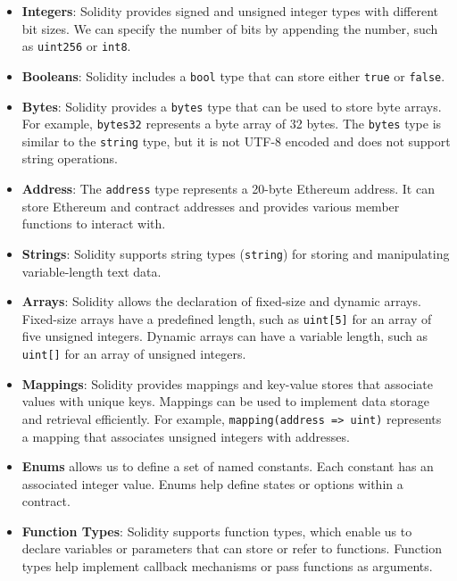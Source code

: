 \begin{itemize}
   \item \textbf{Integers}: Solidity provides signed and unsigned integer types with different bit sizes. We can specify the number of bits by appending the number, such as \texttt{uint256} or \texttt{int8}.


   \item \textbf{Booleans}: Solidity includes a \texttt{bool} type that can store either \texttt{true} or \texttt{false}.


   \item \textbf{Bytes}: Solidity provides a \texttt{bytes} type that can be used to store byte arrays. For example, \texttt{bytes32} represents a byte array of 32 bytes. The \texttt{bytes} type is similar to the \texttt{string} type, but it is not UTF-8 encoded and does not support string operations.


   \item \textbf{Address}: The \texttt{address} type represents a 20-byte Ethereum address. It can store Ethereum and contract addresses and provides various member functions to interact with.


   \item \textbf{Strings}: Solidity supports string types (\texttt{string}) for storing and manipulating variable-length text data.


   \item \textbf{Arrays}: Solidity allows the declaration of fixed-size and dynamic arrays. Fixed-size arrays have a predefined length, such as \texttt{uint[5]} for an array of five unsigned integers. Dynamic arrays can have a variable length, such as \texttt{uint[]} for an array of unsigned integers.


   \item \textbf{Mappings}: Solidity provides mappings and key-value stores that associate values with unique keys. Mappings can be used to implement data storage and retrieval efficiently. For example, \texttt{mapping(address => uint)} represents a mapping that associates unsigned integers with addresses.


   \item \textbf{Enums} allows us to define a set of named constants. Each constant has an associated integer value. Enums help define states or options within a contract.


   \item \textbf{Function Types}: Solidity supports function types, which enable us to declare variables or parameters that can store or refer to functions. Function types help implement callback mechanisms or pass functions as arguments.


\end{itemize}

